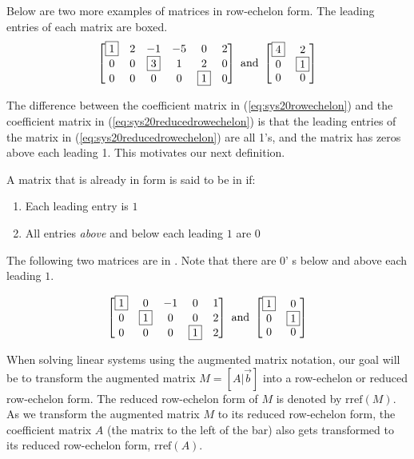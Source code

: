 \documentclass{ximera}
\begin{document}
Below are two more examples of matrices in row-echelon form.  The leading entries of each matrix are boxed.
$$\begin{bmatrix}
 \fbox{1}&2&-1&-5&0&2\\0&0&\fbox{3}&1&2&0\\0&0&0&0&\fbox{1}&0
 \end{bmatrix}\quad\text{and}\quad\begin{bmatrix}
 \fbox{4}&2\\0&\fbox{1}\\0&0
 \end{bmatrix}$$
  

The difference between the coefficient matrix in  (\ref{eq:sys20rowechelon}) and the coefficient matrix in (\ref{eq:sys20reducedrowechelon}) is that the leading entries of the  matrix in (\ref{eq:sys20reducedrowechelon}) are all 1's, and the matrix has zeros above each leading 1.  This motivates our next definition.
 
\begin{definition}\label{def:rref}
A matrix that is already in  form is said to be in  if:
\begin{enumerate}
\item Each leading entry is $1$
\item All entries {\it above} and below each leading $1$ are $0$
\end{enumerate}
\end{definition}

The following two matrices are in .  Note that there are $0$'
s below and above each leading $1$.
 
$$\begin{bmatrix} 
 \fbox{1}&0&-1&0&1\\0&\fbox{1}&0&0&2\\0&0&0&\fbox{1}&2
 \end{bmatrix}\quad\text{and}\quad\begin{bmatrix}
 \fbox{1}&0\\0&\fbox{1}\\0&0
 \end{bmatrix}$$
  
 When solving linear systems using the augmented matrix notation, our goal will be to transform the augmented matrix $M=[A|\vec{b}]$ into a row-echelon or reduced row-echelon form.  The reduced row-echelon form of $M$ is denoted by
$\mbox{rref}(M)$.  As we transform the augmented matrix $M$ to its reduced row-echelon form, the coefficient matrix $A$ (the matrix to the left of the bar) also gets transformed to its reduced row-echelon form, $\mbox{rref}(A)$.
 
\end{document}
